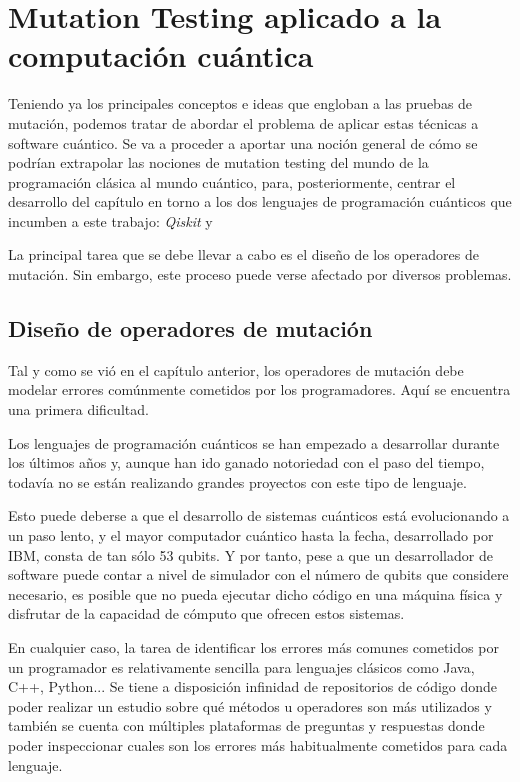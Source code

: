 	
\chapter{Mutation Testing aplicado a la computación cuántica}

Teniendo ya los principales conceptos e ideas que engloban a las pruebas de mutación, podemos tratar de abordar el problema de aplicar estas técnicas a software cuántico. Se va a proceder a aportar una noción general de cómo se podrían extrapolar las nociones de mutation testing del mundo de la programación clásica al mundo cuántico, para, posteriormente, centrar el desarrollo del capítulo en torno a los dos lenguajes de programación cuánticos que incumben a este trabajo: \textit{Qiskit} y \qsh

La principal tarea que se debe llevar a cabo es el diseño de los operadores de mutación. Sin embargo, este proceso puede verse afectado por diversos problemas.

\section{Diseño de operadores de mutación}

Tal y como se vió en el capítulo anterior, los operadores de mutación debe modelar errores comúnmente cometidos por los programadores. Aquí se encuentra una primera dificultad.

Los lenguajes de programación cuánticos se han empezado a desarrollar durante los últimos años y, aunque han ido ganado notoriedad con el paso del tiempo, todavía no se están realizando grandes proyectos con este tipo de lenguaje. 

Esto puede deberse a que el desarrollo de sistemas cuánticos está evolucionando a un paso lento, y el mayor computador cuántico hasta la fecha, desarrollado por IBM, consta de tan sólo 53 qubits. Y por tanto, pese a que un desarrollador de software puede contar a nivel de simulador con el número de qubits que considere necesario, es posible que no pueda ejecutar dicho código en una máquina física y disfrutar de la capacidad de cómputo que ofrecen estos sistemas.

En cualquier caso, la tarea de identificar los errores más comunes cometidos por un programador es relativamente sencilla para lenguajes clásicos como Java, C++, Python... Se tiene a disposición infinidad de repositorios de código donde poder realizar un estudio sobre qué métodos u operadores son más utilizados y también se cuenta con múltiples plataformas de preguntas y respuestas donde poder inspeccionar cuales son los errores más habitualmente cometidos para cada lenguaje. 

